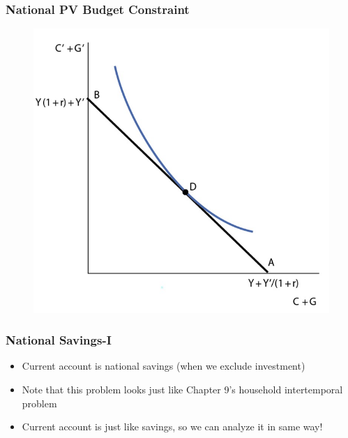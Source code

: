 \documentclass{beamer}
\begin{document}
\begin{frame}
\frametitle[alignment=center]{National PV Budget Constraint}
\begin{figure}
\centering
\includegraphics[scale=0.75]{Figures/W_Fig_16pt1.png}
\end{figure}
\end{frame}

\begin{frame}
\frametitle[alignment=center]{National Savings-I}
\begin{itemize}
\item Current account is national savings (when we exclude investment)
\bigskip
\item Note that this problem looks just like Chapter 9's household intertemporal problem
\bigskip
\item Current account is just like savings, so we can analyze it in same way!
\end{itemize}
\end{frame}
\end{document}
